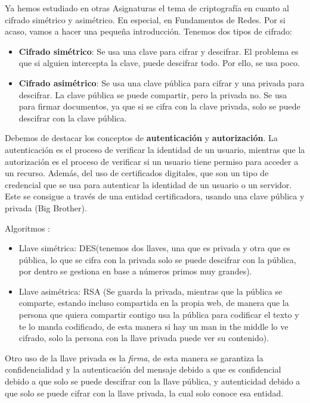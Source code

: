 Ya hemos estudiado en otras Asignaturas el tema de criptografía en cuanto al cifrado simétrico y asimétrico. En especial, en Fundamentos de Redes. Por si acaso, vamos a hacer una pequeña introducción. Tenemos dos tipos de cifrado:
\begin{itemize}
    \item \textbf{Cifrado simétrico}: Se usa una clave para cifrar y descifrar. El problema es que si alguien intercepta la clave, puede descifrar todo. Por ello, se usa poco.
    \item \textbf{Cifrado asimétrico}: Se usa una clave pública para cifrar y una privada para descifrar. La clave pública se puede compartir, pero la privada no. Se usa para firmar documentos, ya que si se cifra con la clave privada, solo se puede descifrar con la clave pública.
\end{itemize}

Debemos de destacar los conceptos de \textbf{autenticación} y \textbf{autorización}. La autenticación es el proceso de verificar la identidad de un usuario, mientras que la autorización es el proceso de verificar si un usuario tiene permiso para acceder a un recurso. Además, del uso de certificados digitales, que son un tipo de credencial que se usa para autenticar la identidad de un usuario o un servidor. Este se consigue a través de una entidad certificadora, usando una clave pública y privada (Big Brother).

Algoritmos :
\begin{itemize}
    \item Llave simétrica: DES(tenemos dos llaves, una que es privada y otra que es pública, lo que se cifra con la privada solo se puede descifrar con la pública, por dentro se gestiona en base a números primos muy grandes).
    \item Llave asimétrica: RSA (Se guarda la privada, mientras que la pública se comparte, estando incluso compartida en la propia web, de manera que la persona que quiera compartir contigo usa la pública para codificar el texto y te lo manda codificado, de esta manera si hay un man in the middle lo ve cifrado, solo la persona con la llave privada puede ver su contenido).
\end{itemize}

Otro uso de la llave privada es la \textit{firma}, de esta manera se garantiza la confidencialidad y la autenticación del mensaje debido a que es confidencial debido a que solo se puede descifrar con la llave pública, y autenticidad debido a que solo se puede cifrar con la llave privada, la cual solo conoce esa entidad.

